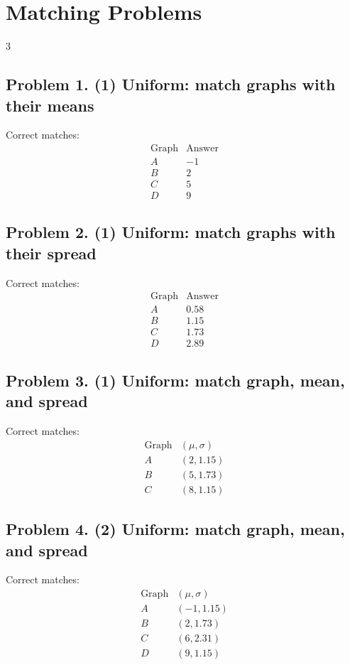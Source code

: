 \section{Matching Problems}
\begin{multicols}{3}

\subsection*{Problem 1. (1) Uniform: match graphs with their means}
Correct matches:
\[
\begin{array}{c|c}
\text{Graph} & \text{Answer} \\
\hline
A & -1 \\
B & 2 \\
C & 5 \\
D & 9
\end{array}
\]

\subsection*{Problem 2. (1) Uniform: match graphs with their spread}
Correct matches:
\[
\begin{array}{c|c}
\text{Graph} & \text{Answer} \\
\hline
A & 0.58 \\
B & 1.15 \\
C & 1.73 \\
D & 2.89
\end{array}
\]

\subsection*{Problem 3. (1) Uniform: match graph, mean, and spread}
Correct matches:
\[
\begin{array}{c|c}
\text{Graph} & (\mu,\sigma) \\
\hline
A & (2,1.15) \\
B & (5,1.73) \\
C & (8,1.15)
\end{array}
\]

\subsection*{Problem 4. (2) Uniform: match graph, mean, and spread}
Correct matches:
\[
\begin{array}{c|c}
\text{Graph} & (\mu,\sigma) \\
\hline
A & (-1,1.15) \\
B & (2,1.73) \\
C & (6,2.31) \\
D & (9,1.15)
\end{array}
\]


\end{multicols}
